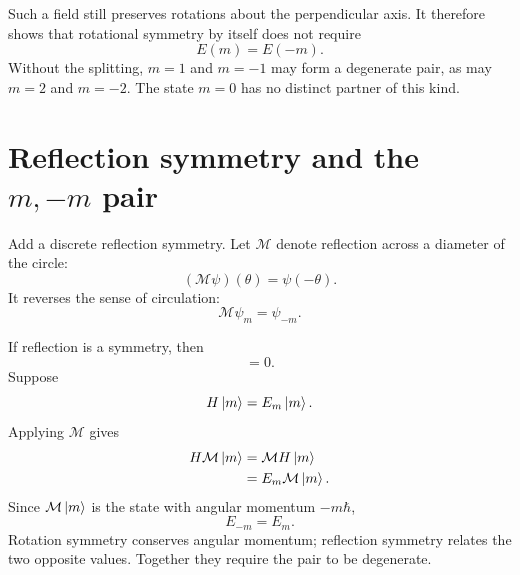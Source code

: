 Such a field still preserves rotations about the perpendicular axis. It therefore shows that rotational symmetry by itself does not require
\begin{equation}
E(m)=E(-m).
\end{equation}
Without the splitting, \(m=1\) and \(m=-1\) may form a degenerate pair, as may \(m=2\) and \(m=-2\). The state \(m=0\) has no distinct partner of this kind.

\section{Reflection symmetry and the \(m,-m\) pair}

Add a discrete reflection symmetry. Let \(\mathcal M\) denote reflection across a diameter of the circle:
\begin{equation}
(\mathcal M\psi)(\theta)=\psi(-\theta).
\end{equation}
It reverses the sense of circulation:
\begin{equation}
\mathcal M\psi_m=\psi_{-m}.
\end{equation}

If reflection is a symmetry, then
\begin{equation}
[\mathcal M,H]=0.
\end{equation}
Suppose
\begin{equation}
H\left\lvert m\right\rangle=E_m\left\lvert m\right\rangle.
\end{equation}
Applying \(\mathcal M\) gives
\begin{align}
H\mathcal M\left\lvert m\right\rangle
&=\mathcal M H\left\lvert m\right\rangle\\
&=E_m\mathcal M\left\lvert m\right\rangle.
\end{align}
Since \(\mathcal M\left\lvert m\right\rangle\) is the state with angular momentum \(-m\hbar\),
\begin{equation}
E_{-m}=E_m.
\end{equation}
Rotation symmetry conserves angular momentum; reflection symmetry relates the two opposite values. Together they require the pair to be degenerate.

\begin{classroomqa}
\end{classroomqa}

